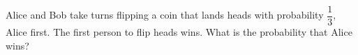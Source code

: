 Alice and Bob take turns flipping a coin that lands heads with probability $\dfrac13$, Alice first. The first person to flip heads wins. What is the probability that Alice wins?
